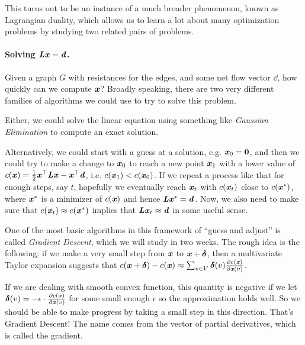 This turns out to be an instance of a much broader phenomenon, known
as Lagrangian duality, which allows us to learn a lot about many
optimization problems by studying two related pairs of problems.

\paragraph{Solving $\boldsymbol{\mathit{L}} \boldsymbol{\mathit{x}} = \boldsymbol{\mathit{d}}$.}
Given a graph $G$ with resistances for the edges, and some net flow
vector $\dd$, how quickly can we compute $\boldsymbol{\mathit{x}}$?
%
Broadly speaking, there are two very different families of algorithms
we could use to try to solve this problem.

Either, we could solve the linear equation using something like
\emph{Gaussian Elimination} to compute an exact solution.

Alternatively,
we could start with a guess at a solution, e.g. $\boldsymbol{\mathit{x}}_0
= \boldsymbol{0}$, and then we could try to make a change to $\boldsymbol{\mathit{x}}_0$ to reach
a new point $\boldsymbol{\mathit{x}}_1$ with a lower value of $c(\boldsymbol{\mathit{x}}) = \frac{1}{2} \boldsymbol{\mathit{x}}^{\top} \boldsymbol{\mathit{L}} \boldsymbol{\mathit{x}} -
\boldsymbol{\mathit{x}}^{\top}\boldsymbol{\mathit{d}}$, i.e. $c(\boldsymbol{\mathit{x}}_1) < c(\boldsymbol{\mathit{x}}_0)$.
If we repeat a process like that for enough steps, say $t$, hopefully we
eventually reach $\boldsymbol{\mathit{x}}_t$ with $c(\boldsymbol{\mathit{x}}_t)$ close to $c(\boldsymbol{\mathit{x}}^*)$, where
$\boldsymbol{\mathit{x}}^*$ is a minimizer of $c(\boldsymbol{\mathit{x}})$ and hence $\boldsymbol{\mathit{L}} \boldsymbol{\mathit{x}}^* = \boldsymbol{\mathit{d}}$.
Now, we also need to make sure that $c(\boldsymbol{\mathit{x}}_t) \approx c(\boldsymbol{\mathit{x}}^*)$
implies that $\boldsymbol{\mathit{L}} \boldsymbol{\mathit{x}}_t \approx \boldsymbol{\mathit{d}}$ in some useful sense.

One of the most basic algorithms in this framework of ``guess and adjust''
is called \emph{Gradient Descent}, which we will study in two weeks.
The rough idea is the following: if we make a very small step from $\boldsymbol{\mathit{x}}$ to
$\boldsymbol{\mathit{x}} + \boldsymbol{\delta}$, then a multivariate Taylor expansion suggests that
$c(\boldsymbol{\mathit{x}} + \boldsymbol{\delta}) - c(\boldsymbol{\mathit{x}}) \approx \sum_{v \in V} \boldsymbol{\delta}(v)
\frac{\partial c(\boldsymbol{\mathit{x}})}{\partial\boldsymbol{\mathit{x}}(v)} $.

If we are dealing with smooth convex function,
this quantity is negative if we let $\boldsymbol{\delta}(v) = -\epsilon \cdot \frac{\partial
  c(\boldsymbol{\mathit{x}})}{\partial\boldsymbol{\mathit{x}}(v)}$ for some small enough $\epsilon$ so the
approximation holds well.
So we should be able to make progress by taking a small step in this
direction.
That's Gradient Descent!
The name comes from the vector of partial
derivatives, which is called the gradient.

